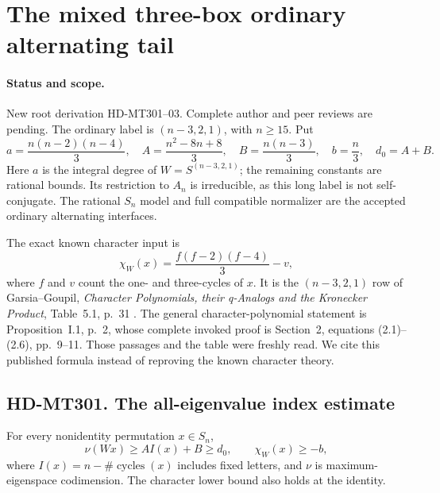 \section{The mixed three-box ordinary alternating tail}
\label{sec:alternating-mixed-three-tail}

\paragraph{Status and scope.}
New root derivation HD-MT301--03. Complete author and peer
reviews are pending. The ordinary label is $(n-3,2,1)$,
with $n\ge15$. Put
\[
 a=\frac{n(n-2)(n-4)}3,\quad
 A=\frac{n^2-8n+8}3,\quad B=\frac{n(n-3)}3,\quad
 b=\frac n3,\quad d_0=A+B.                              \tag{MT3.1}
\]
Here $a$ is the integral degree of $W=S^{(n-3,2,1)}$;
the remaining constants are rational bounds. Its restriction
to $A_n$ is irreducible, as this long label is not self-conjugate.
The rational $S_n$ model and full compatible normalizer are
the accepted ordinary alternating interfaces.

The exact known character input is
\[
               \chi_W(x)=\frac{f(f-2)(f-4)}3-v,          \tag{MT3.2}
\]
where $f$ and $v$ count the one- and three-cycles of $x$.
It is the $(n-3,2,1)$ row of Garsia--Goupil,
\emph{Character Polynomials, their q-Analogs and the Kronecker
Product}, Table~5.1, p.~31 \cite{HD:GarsiaGoupil2009}.
The general character-polynomial statement is Proposition~I.1,
p.~2, whose complete invoked proof is Section~2, equations
(2.1)--(2.6), pp.~9--11. Those passages and the table were
freshly read. We cite this published formula instead of
reproving the known character theory.

\subsection*{HD-MT301. The all-eigenvalue index estimate}

\begin{lemma}[HD-MT301]
For every nonidentity permutation $x\in S_n$,
\[
 \nu(Wx)\ge A I(x)+B\ge d_0,
 \qquad \chi_W(x)\ge-b,                                \tag{MT3.3}
\]
where $I(x)=n-\#\operatorname{cycles}(x)$ includes fixed
letters, and $\nu$ is maximum-eigenspace codimension.
The character lower bound also holds at the identity.
\end{lemma}

